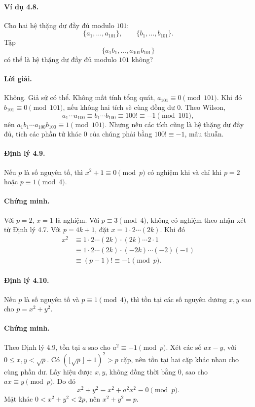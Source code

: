 \documentclass[11pt]{article}
\begin{document}
\paragraph{Ví dụ 4.8.}
Cho hai hệ thặng dư đầy đủ modulo \(101\):
\[
 \{a_1,\ldots,a_{101}\},\qquad \{b_1,\ldots,b_{101}\}.
\]
Tập
\[
 \{a_1b_1,\ldots,a_{101}b_{101}\}
\]
có thể là hệ thặng dư đầy đủ modulo \(101\) không?

\paragraph{Lời giải.}
Không. Giả sử có thể. Không mất tính tổng quát, \(a_{101}\equiv0\pmod{101}\).
Khi đó \(b_{101}\equiv0\pmod{101}\), nếu không hai tích sẽ cùng đồng dư \(0\).
Theo Wilson,
\[
 a_1\cdots a_{100}\equiv b_1\cdots b_{100}\equiv100!\equiv-1\pmod{101},
\]
nên \(a_1b_1\cdots a_{100}b_{100}\equiv1\pmod{101}\). Nhưng nếu các tích cũng
là hệ thặng dư đầy đủ, tích các phần tử khác \(0\) của chúng phải bằng
\(100!\equiv-1\), mâu thuẫn.

\paragraph{Định lý 4.9.}
Nếu \(p\) là số nguyên tố, thì \(x^2+1\equiv0\pmod p\) có nghiệm khi và chỉ
khi \(p=2\) hoặc \(p\equiv1\pmod4\).

\paragraph{Chứng minh.}
Với \(p=2\), \(x=1\) là nghiệm. Với \(p\equiv3\pmod4\), không có nghiệm theo
nhận xét từ Định lý 4.7. Với \(p=4k+1\), đặt \(x=1\cdot2\cdots(2k)\). Khi đó
\[
\begin{aligned}
x^2&\equiv1\cdot2\cdots(2k)\cdot(2k)\cdots2\cdot1\\
&\equiv1\cdot2\cdots(2k)\cdot(-2k)\cdots(-2)(-1)\\
&\equiv(p-1)!\equiv-1\pmod p.
\end{aligned}
\]

\paragraph{Định lý 4.10.}
Nếu \(p\) là số nguyên tố và \(p\equiv1\pmod4\), thì tồn tại các số nguyên
dương \(x,y\) sao cho \(p=x^2+y^2\).

\paragraph{Chứng minh.}
Theo Định lý 4.9, tồn tại \(a\) sao cho \(a^2\equiv-1\pmod p\). Xét các số
\(ax-y\), với \(0\le x,y<\sqrt p\). Có \((\lfloor\sqrt p\rfloor+1)^2>p\) cặp,
nên tồn tại hai cặp khác nhau cho cùng phần dư. Lấy hiệu được \(x,y\), không
đồng thời bằng \(0\), sao cho \(ax\equiv y\pmod p\). Do đó
\[
 x^2+y^2\equiv x^2+a^2x^2\equiv0\pmod p.
\]
Mặt khác \(0<x^2+y^2<2p\), nên \(x^2+y^2=p\).
\end{document}
